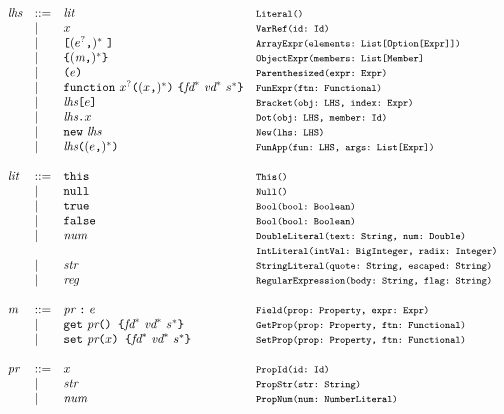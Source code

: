 \[
\begin{array}{llll}
\lhs &::=& \lit & \mtt{Literal()}\\
 &\mid& \myid & \mtt{VarRef(id:~Id)}\\
 &\mid& \verb+[+ (\expr^?\verb+,+)^* \ \verb+]+ & \mtt{ArrayExpr(elements:~List[Option[Expr]])}\\
 &\mid& \verb+{+ (\member\verb+,+)^* \verb+}+ & \mtt{ObjectExpr(members:~List[Member]}\\
 &\mid& \verb+(+ \expr \verb+)+ & \mtt{Parenthesized(expr:~Expr)}\\
 & \mid & {\tt function} \ \myid^?  \verb+(+(\myid\verb+,+)^*\verb+)+ \ \verb+{+\fd^*\ \vd^*\ \stmt^*\verb+}+ &
\mtt{FunExpr(ftn:~Functional)}\\
 &\mid& \lhs \verb+[+ \expr \verb+]+ & \mtt{Bracket(obj:~LHS, index:~Expr)}\\
 &\mid& \lhs \verb+.+ \myid & \mtt{Dot(obj:~LHS, member:~Id)}\\
 &\mid& {\tt new} \ \lhs & \mtt{New(lhs:~LHS)}\\
 &\mid& \lhs \verb+(+ (\expr\verb+,+)^* \verb+)+ & \mtt{FunApp(fun:~LHS, args:~List[Expr])} \\ \\

\lit &::=& {\tt this} & \mtt{This()}\\
 &\mid& {\tt null} & \mtt{Null()}\\
 &\mid& {\tt true} & \mtt{Bool(bool:~Boolean)}\\
 &\mid& {\tt false} & \mtt{Bool(bool:~Boolean)}\\
 &\mid& \num & \mtt{DoubleLiteral(text:~String, num:~Double)}\\
&&&\mtt{IntLiteral(intVal:~BigInteger, radix:~Integer)}\\
 &\mid& \str & \mtt{StringLiteral(quote:~String, escaped:~String)}\\
 &\mid& \reg & \mtt{RegularExpression(body:~String, flag:~String)}\\ \\

\member &::=& \prop \ \verb+:+ \ \expr & \mtt{Field(prop:~Property, expr:~Expr)}\\
 &\mid& {\tt get}\ \prop \verb+() {+ \fd^*\ \vd^*\ \stmt^* \verb+}+ 
 & \mtt{GetProp(prop:~Property, ftn:~Functional)}\\
 &\mid& {\tt set}\ \prop \verb+(+ \myid \verb+) {+ \fd^*\ \vd^*\ \stmt^* \verb+}+
 & \mtt{SetProp(prop:~Property, ftn:~Functional)}\\ \\

\prop &::= & \myid & \mtt{PropId(id:~Id)}\\
 &\mid& \str & \mtt{PropStr(str:~String)}\\
 &\mid& \num & \mtt{PropNum(num:~NumberLiteral)}\\
\end{array}
\]

